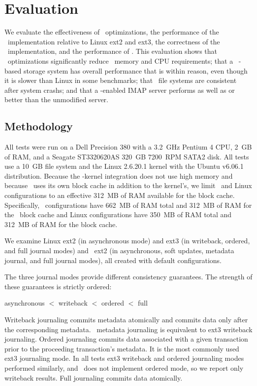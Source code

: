 
\section {Evaluation}
\label{sec:evaluation}
\label{eval}

We evaluate
%
the effectiveness of \patch\ optimizations,
%
the performance of the \Kudos\ implementation relative to Linux ext2
and ext3,
%
the correctness of the \Kudos\ implementation,
%
and the performance of \patchgroups.
%
This evaluation shows
%
that \patch\ optimizations significantly reduce \patch\ memory and CPU
requirements;
%
that a \Kudos\ \patch-based storage system has overall performance
that is within reason, even though it is slower than Linux in some
benchmarks;
%
that \Kudos\ file systems are consistent after system crashs;
%
and that a \patchgroup-enabled IMAP server performs as well as or
better than the unmodified server.

\subsection{Methodology}

All tests were run on a Dell Precision 380 with a 3.2~GHz Pentium 4
CPU, 2~GB of RAM, and a Seagate ST3320620AS 320~GB 7200~RPM SATA2 disk.
%
All tests use a 10~GB file system and the Linux 2.6.20.1 kernel
with the Ubuntu v6.06.1 distribution.
%
Because the \Kudos-kernel integration does not use high memory and
because \Kudos\ uses its own block cache in addition to the kernel's,
we limit \Kudos\ and Linux configurations to an effective 312~MB of
RAM available for the block cache.
%
Specifically, \Kudos\ configurations have 662~MB of RAM total and
312~MB of RAM for the \Kudos\ block cache
%
and Linux configurations have 350~MB of RAM total and 312~MB of RAM
for the block cache.

We examine Linux ext2 (in asynchronous mode) and ext3 (in writeback,
ordered, and full journal modes) and \Kudos\ ext2 (in asynchronous,
soft updates, metadata journal, and full journal modes), all created
with default configurations.

The three journal modes provide different consistency guarantees.
The strength of these guarantees is strictly ordered:
\vspace{-0.5\baselineskip}
\begin{center}
asynchronous $<$ writeback $<$ ordered $<$ full
\end{center}
\vspace{-0.5\baselineskip}
Writeback journaling commits metadata atomically and commits data only
after the corresponding metadata. \Kudos\ metadata journaling is
equivalent to ext3 writeback journaling.
%
Ordered journaling commits data associated with a given transaction
prior to the proceeding transaction's metadata. It is the most
commonly used ext3 journaling mode.
%
In all tests ext3 writeback and ordered journaling modes performed
similarly, and \Kudos\ does not implement ordered mode, so we report
only writeback results.
%
Full journaling commits data atomically.

